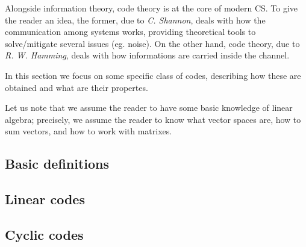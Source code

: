 \documentclass{subfiles}
\begin{document}
    Alongside information theory, code theory is at the core of modern CS. 
        To give the reader an idea, the former, due to \emph{C. Shannon},
        deals with how the communication among systems works, 
        providing theoretical tools to solve/mitigate several issues (eg. noise).
        On the other hand, code theory, due to \emph{R. W. Hamming},
        deals with how informations are carried inside the channel.

    In this section we focus on some specific class of codes, 
        describing how these are obtained and what are their propertes.

    Let us note that we assume the reader to have some basic knowledge of 
        linear algebra; precisely, we assume the reader to know what vector spaces are,
        how to sum vectors, and how to work with matrixes.

    \subsection{Basic definitions}
    

    \subsection{Linear codes}
    

    \subsection{Cyclic codes}
    
\end{document}
